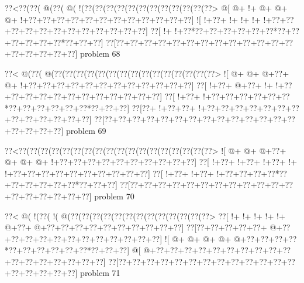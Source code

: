 \vbox{\vbox{\goo
\0??<\0??(\0??(\- @(\0??(\- @(\- !(\0??(\0??(\0??(\0??(\0??(\0??(\0??(\0??(\0??(\0??(\0??(\0??>
\- @[\- @+\- !+\- @+\- @+\- @+\- !+\0??+\0??+\0??+\0??+\0??+\0??+\0??+\0??+\0??+\0??+\0??+\0??]
\- ![\- !+\0??+\- !+\- !+\- !+\- !+\0??+\0??+\0??+\0??+\0??+\0??+\0??+\0??+\0??+\0??+\0??+\0??]
\0??[\- !+\- !+\0??*\0??+\0??+\0??+\0??+\0??+\0??*\0??+\0??+\0??+\0??+\0??+\0??*\0??+\0??+\0??]
\0??[\0??+\0??+\0??+\0??+\0??+\0??+\0??+\0??+\0??+\0??+\0??+\0??+\0??+\0??+\0??+\0??+\0??+\0??]
}
\hfil problem 68\hfil\break
}



\vbox{\vbox{\goo
\0??<\- @(\0??(\- @(\0??(\0??(\0??(\0??(\0??(\0??(\0??(\0??(\0??(\0??(\0??(\0??(\0??(\0??(\0??>
\- ![\- @+\- @+\- @+\0??+\- @+\- !+\0??+\0??+\0??+\0??+\0??+\0??+\0??+\0??+\0??+\0??+\0??+\0??]
\0??[\- !+\0??+\- @+\0??+\- !+\- !+\0??+\0??+\0??+\0??+\0??+\0??+\0??+\0??+\0??+\0??+\0??+\0??]
\0??[\- !+\0??+\- !+\0??+\0??+\0??+\0??+\0??+\0??*\0??+\0??+\0??+\0??+\0??+\0??*\0??+\0??+\0??]
\0??[\0??+\- !+\0??+\0??+\- !+\0??+\0??+\0??+\0??+\0??+\0??+\0??+\0??+\0??+\0??+\0??+\0??+\0??]
\0??[\0??+\0??+\0??+\0??+\0??+\0??+\0??+\0??+\0??+\0??+\0??+\0??+\0??+\0??+\0??+\0??+\0??+\0??]
}
\hfil problem 69\hfil\break
}



\vbox{\vbox{\goo
\0??<\0??(\0??(\0??(\0??(\0??(\0??(\0??(\0??(\0??(\0??(\0??(\0??(\0??(\0??(\0??(\0??(\0??(\0??>
\- ![\- @+\- @+\- @+\0??+\- @+\- @+\- @+\- !+\0??+\0??+\0??+\0??+\0??+\0??+\0??+\0??+\0??+\0??]
\0??[\- !+\0??+\- !+\0??+\- !+\0??+\- !+\- !+\0??+\0??+\0??+\0??+\0??+\0??+\0??+\0??+\0??+\0??]
\0??[\- !+\0??+\- !+\0??+\- !+\0??+\0??+\0??+\0??*\0??+\0??+\0??+\0??+\0??+\0??*\0??+\0??+\0??]
\0??[\0??+\0??+\0??+\0??+\0??+\0??+\0??+\0??+\0??+\0??+\0??+\0??+\0??+\0??+\0??+\0??+\0??+\0??]
}
\hfil problem 70\hfil\break
}



\vbox{\vbox{\goo
\0??<\- @(\- !(\0??(\- !(\- @(\0??(\0??(\0??(\0??(\0??(\0??(\0??(\0??(\0??(\0??(\0??(\0??(\0??>
\0??[\- !+\- !+\- !+\- !+\- !+\- @+\0??+\- @+\0??+\0??+\0??+\0??+\0??+\0??+\0??+\0??+\0??+\0??]
\0??[\0??+\0??+\0??+\0??+\0??+\- @+\0??+\0??+\0??+\0??+\0??+\0??+\0??+\0??+\0??+\0??+\0??+\0??]
\- ![\- @+\- @+\- @+\- @+\- @+\0??+\0??+\0??+\0??*\0??+\0??+\0??+\0??+\0??+\0??*\0??+\0??+\0??]
\- @[\- @+\0??+\0??+\0??+\0??+\0??+\0??+\0??+\0??+\0??+\0??+\0??+\0??+\0??+\0??+\0??+\0??+\0??]
\0??[\0??+\0??+\0??+\0??+\0??+\0??+\0??+\0??+\0??+\0??+\0??+\0??+\0??+\0??+\0??+\0??+\0??+\0??]
}
\hfil problem 71\hfil\break
}




